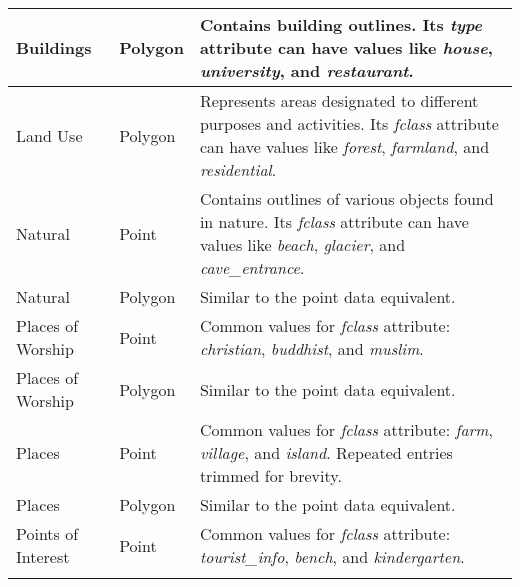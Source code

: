 \begin{longtable}{p{3cm}p{2.5cm}p{8cm}}
    Buildings          & Polygon            & Contains building outlines. Its \emph{type} attribute can have values like \emph{house}, \emph{university}, and \emph{restaurant}.                                                  \\
    \midrule
    Land Use           & Polygon            & Represents areas designated to different purposes and activities. Its \emph{fclass} attribute can have values like \emph{forest}, \emph{farmland}, and \emph{residential}.          \\
    \midrule
    Natural            & Point              & Contains outlines of various objects found in nature. Its \emph{fclass} attribute can have values like \emph{beach}, \emph{glacier}, and \emph{cave\_entrance}.                     \\
    \midrule
    Natural            & Polygon            & Similar to the point data equivalent.                                                                                                                                               \\
    \midrule
    Places of Worship  & Point              & Common values for \emph{fclass} attribute: \emph{christian}, \emph{buddhist}, and \emph{muslim}.                                                                                    \\
    \midrule
    Places of Worship  & Polygon            & Similar to the point data equivalent.                                                                                                                                               \\
    \midrule
    Places             & Point              & Common values for \emph{fclass} attribute: \emph{farm}, \emph{village}, and \emph{island}. Repeated entries trimmed for brevity.                                                    \\
    \midrule
    Places             & Polygon            & Similar to the point data equivalent.                                                                                                                                               \\
    \midrule
    Points of Interest & Point              & Common values for \emph{fclass} attribute: \emph{tourist\_info}, \emph{bench}, and \emph{kindergarten}.                                                                             \\                                                                                                                                        \\

\end{longtable}

